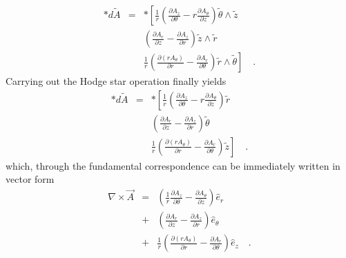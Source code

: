 \documentclass[twocolumn]{article}
\def\.{{\quad .}}
\begin{document}
\begin{eqnarray*}
	\ast d {\tilde A} & = & \ast \left[
							   \frac{1}{r}
	                           \left(
							    \frac{\partial A_z}
								     {\partial \theta}
							    -
								r \frac{\partial A_{\theta}}
								       {\partial z}
							   \right) 
							   \tilde \theta \wedge \tilde z 
							   \right. \\
							  & &
							 \left(
							  \frac{\partial A_r}
							       {\partial z}
							 -
							  \frac{\partial A_z}
							       {\partial r}
							 \right) 
							 \tilde z \wedge \tilde r \\
							 & &
							 \left.
							 \frac{1}{r}
							 \left(
							  \frac{\partial \left( 
							        r A_{\theta}\right)}
									{\partial r}
							 -
							  \frac{\partial A_r}
							       {\partial \theta} 
							 \right) 
							 \tilde r \wedge \tilde \theta
							 \right] \. 
\end{eqnarray*}
Carrying out the Hodge star operation finally yields
\begin{eqnarray*}
	\ast d {\tilde A} & = & \ast \left[
							   \frac{1}{r}
	                           \left(
							    \frac{\partial A_z}
								     {\partial \theta}
							    -
								r \frac{\partial A_{\theta}}
								       {\partial z}
							   \right) 
							   \tilde r 
							   \right. \\
							  & &
							 \left(
							  \frac{\partial A_r}
							       {\partial z}
							 -
							  \frac{\partial A_z}
							       {\partial r}
							 \right) 
							 \tilde \theta \\
							 & &
							 \left.
							 \frac{1}{r}
							 \left(
							  \frac{\partial \left( 
							        r A_{\theta}\right)}
									{\partial r}
							 -
							  \frac{\partial A_r}
							       {\partial \theta} 
							 \right) 
							 \tilde z
							 \right] \. 
\end{eqnarray*}
which, through the fundamental correspondence can be immediately
written in vector form
\begin{eqnarray*}
	\nabla \times {\vec A} & = & 
	                        \left(
	                         \frac{1}{r} 
							 \frac{\partial A_{z}}
							      {\partial \theta}
							 -
							 \frac{\partial A_{\theta}}
							      {\partial z}
	                        \right) {\hat e}_{r} \\
							& + & 
							\left(
							 \frac{\partial A_{r}}
							      {\partial z}
						     -
							 \frac{\partial A_{z}}
							      {\partial r}
							\right) {\hat e}_{\theta} \\
							& + & 
							\frac{1}{r}
							\left(
							 \frac{\partial 
							        \left(r A_{\theta}\right)}
							      {\partial r}
							-
							 \frac{\partial A_{r}}
							      {\partial \theta}
							\right) {\hat e}_{z} \.
\end{eqnarray*}
\end{document}
